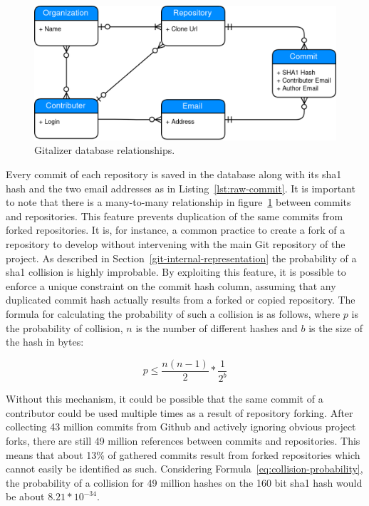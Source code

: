 \begin{figure}[H]
\includegraphics[scale=0.3]{./graphs/gitalizer-data-structure}
\centering
\caption{Gitalizer database relationships.}\label{fig:gitalizer-relationship}
\end{figure}

Every commit of each repository is saved in the database along with its \ac{sha1} hash and the two email addresses as in Listing~\ref{lst:raw-commit}.
It is important to note that there is a many-to-many relationship in figure~\ref{fig:gitalizer-relationship} between commits and repositories.
This feature prevents duplication of the same commits from forked repositories.
It is, for instance, a common practice to create a fork of a repository to develop without intervening with the main Git repository of the project.
As described in Section~\ref{git-internal-representation} the probability of a \ac{sha1} collision is highly improbable.
By exploiting this feature, it is possible to enforce a unique constraint on the commit hash column, assuming that any duplicated commit hash actually results from a forked or copied repository.
The formula for calculating the probability of such a collision is as follows, where $p$ is the probability of collision, $n$ is the number of different hashes and $b$ is the size of the hash in bytes:

\begin{equation}\label{eq:collision-probability}
    p \leq \frac{n(n-1)}{2} * \frac{1}{2^{b}}
\end{equation}

Without this mechanism, it could be possible that the same commit of a contributor could be used multiple times as a result of repository forking.
After collecting 43 million commits from Github and actively ignoring obvious project forks, there are still 49 million references between commits and repositories.
This means that about 13\% of gathered commits result from forked repositories which cannot easily be identified as such.
Considering Formula~\ref{eq:collision-probability}, the probability of a collision for 49 million hashes on the 160 bit \ac{sha1} hash would be about $8.21 * 10^{-34}$.

